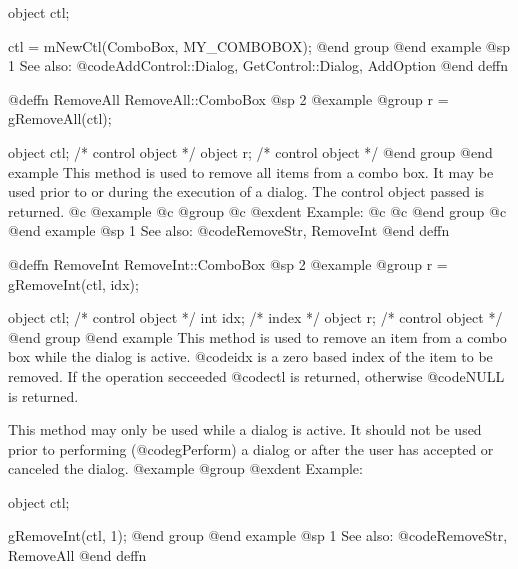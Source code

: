 object  ctl;

ctl = mNewCtl(ComboBox, MY_COMBOBOX);
@end group
@end example
@sp 1
See also:  @code{AddControl::Dialog, GetControl::Dialog, AddOption}
@end deffn




















@deffn {RemoveAll} RemoveAll::ComboBox
@sp 2
@example
@group
r = gRemoveAll(ctl);

object  ctl;    /*  control object  */
object  r;      /*  control object  */
@end group
@end example
This method is used to remove all items from a combo box.  It may be used
prior to or during the execution of a dialog.  The control object passed
is returned.
@c @example
@c @group
@c @exdent Example:
@c 
@c @end group
@c @end example
@sp 1
See also:  @code{RemoveStr, RemoveInt}
@end deffn

















@deffn {RemoveInt} RemoveInt::ComboBox
@sp 2
@example
@group
r = gRemoveInt(ctl, idx);

object  ctl;    /*  control object  */
int     idx;    /*  index           */
object  r;      /*  control object  */
@end group
@end example
This method is used to remove an item from a combo box while the dialog
is active.  @code{idx} is a zero based index of the item to be removed.
If the operation secceeded @code{ctl} is returned, otherwise @code{NULL}
is returned.

This method may only be used while a dialog is active.  It should not be
used prior to performing (@code{gPerform}) a dialog or after the user
has accepted or canceled the dialog.
@example
@group
@exdent Example:

object  ctl;

gRemoveInt(ctl, 1);
@end group
@end example
@sp 1
See also:  @code{RemoveStr, RemoveAll}
@end deffn














